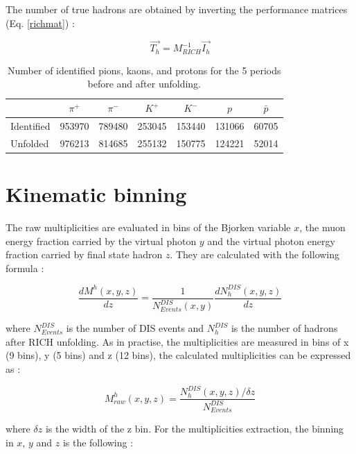 The number of true hadrons are obtained by inverting the performance matrices (Eq. \ref{richmat}) :

\begin{equation}
  \overrightarrow{T_h} = M^{-1}_{RICH}\overrightarrow{I_h}
	\label{richmat}
\end{equation}

\begin{table}[!h]
  \caption{\label{HadNum} Number of identified pions, kaons, and protons for the 5 periods before and after unfolding.}
  \centering
  \begin{tabular}{lcccccc}
    \hline
     & $\pi^+$ & $\pi^-$ & $K^+$ & $K^-$ & $p$ & $\bar{p}$ \\
    \hline
    Identified & 953970 & 789480 & 253045 & 153440 & 131066 & 60705 \\
    Unfolded & 976213 & 814685 & 255132 & 150775 & 124221 & 52014 \\
    \hline
  \end{tabular}
\end{table}


\section{Kinematic binning}

The raw multiplicities are evaluated in bins of the Bjorken variable $x$, the muon energy fraction carried by the virtual photon $y$ and the virtual photon energy fraction carried by final state hadron $z$. They are calculated with the following formula :

\begin{equation}
  \frac{dM^h(x,y,z)}{dz}=\frac{1}{N^{DIS}_{Events}(x,y)}\frac{dN^{DIS}_{h}(x,y,z)}{dz}
\end{equation}

where $N^{DIS}_{Events}$ is the number of DIS events and $N^{DIS}_{h}$ is the number of
hadrons after RICH unfolding. As in practise, the multiplicities are measured in bins of
x (9 bins), y (5 bins) and z (12 bins), the calculated multiplicities can be expressed as :

\begin{equation}
  M^h_{raw}(x,y,z) = \frac{N^{DIS}_{h}(x,y,z)/\delta z}{N^{DIS}_{Events}}
\end{equation}

where $\delta z$ is the width of the z bin. For the multiplicities extraction, the binning in
$x$, $y$ and $z$ is the following :

